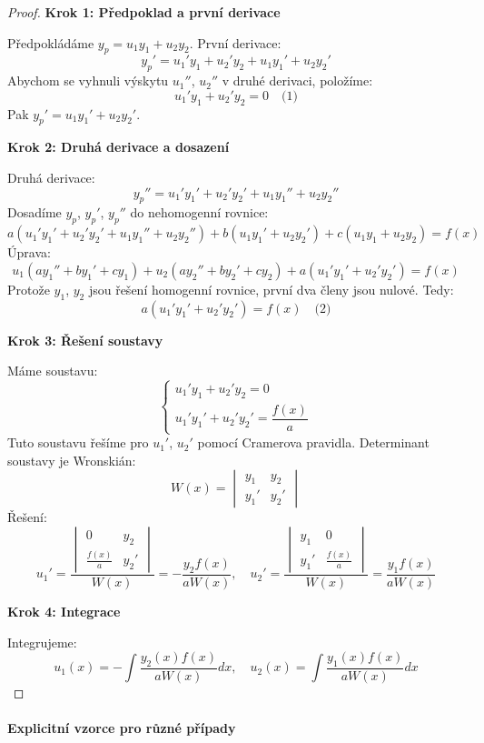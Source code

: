 \begin{proof}
\noindent\textbf{Krok 1: Předpoklad a první derivace}

Předpokládáme $y_p = u_1y_1 + u_2y_2$. První derivace:
\[
y_p' = u_1'y_1 + u_2'y_2 + u_1y_1' + u_2y_2'
\]
Abychom se vyhnuli výskytu $u_1''$, $u_2''$ v druhé derivaci, položíme:
\[
u_1'y_1 + u_2'y_2 = 0 \quad \text{(1)}
\]
Pak $y_p' = u_1y_1' + u_2y_2'$.

\noindent\textbf{Krok 2: Druhá derivace a dosazení}

Druhá derivace:
\[
y_p'' = u_1'y_1' + u_2'y_2' + u_1y_1'' + u_2y_2''
\]
Dosadíme $y_p$, $y_p'$, $y_p''$ do nehomogenní rovnice:
\[
a(u_1'y_1' + u_2'y_2' + u_1y_1'' + u_2y_2'') + b(u_1y_1' + u_2y_2') + c(u_1y_1 + u_2y_2) = f(x)
\]
Úprava:
\[
u_1(ay_1'' + by_1' + cy_1) + u_2(ay_2'' + by_2' + cy_2) + a(u_1'y_1' + u_2'y_2') = f(x)
\]
Protože $y_1$, $y_2$ jsou řešení homogenní rovnice, první dva členy jsou nulové. Tedy:
\[
a(u_1'y_1' + u_2'y_2') = f(x) \quad \text{(2)}
\]

\noindent\textbf{Krok 3: Řešení soustavy}

Máme soustavu:
\[
\begin{cases}
u_1'y_1 + u_2'y_2 = 0 \\
u_1'y_1' + u_2'y_2' = \dfrac{f(x)}{a}
\end{cases}
\]
Tuto soustavu řešíme pro $u_1'$, $u_2'$ pomocí Cramerova pravidla. Determinant soustavy je Wronskián:
\[
W(x) = \begin{vmatrix}
y_1 & y_2 \\
y_1' & y_2'
\end{vmatrix}
\]
Řešení:
\[
u_1' = \frac{\begin{vmatrix}
0 & y_2 \\
\frac{f(x)}{a} & y_2'
\end{vmatrix}}{W(x)} = -\frac{y_2 f(x)}{a W(x)}, \quad
u_2' = \frac{\begin{vmatrix}
y_1 & 0 \\
y_1' & \frac{f(x)}{a}
\end{vmatrix}}{W(x)} = \frac{y_1 f(x)}{a W(x)}
\]

\noindent\textbf{Krok 4: Integrace}

Integrujeme:
\[
u_1(x) = -\int \frac{y_2(x) f(x)}{a W(x)} dx, \quad u_2(x) = \int \frac{y_1(x) f(x)}{a W(x)} dx
\]
\end{proof}

\paragraph{Explicitní vzorce pro různé případy}

